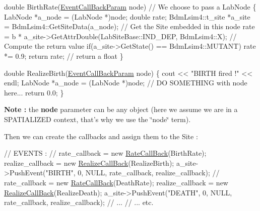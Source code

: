 \begin{DoxyCode}
\textcolor{keywordtype}{double} BirthRate(\hyperlink{namespaceelps_a1bd4230d698fa66dd38f0fc1cc5c2c55}{EventCallBackParam} node)                                   \textcolor{comment}{// We choose
       to pass a LabNode}
\{
        LabNode *a\_node = (LabNode *)node;
        \textcolor{keywordtype}{double} rate;
        BdmLsim4::t\_site *a\_site = BdmLsim4::GetSiteData(a\_node);               \textcolor{comment}{// Get the Site embedded in
       this node}
        rate = b * a\_site->GetAttrDouble(LabSiteBase::IND\_DEP, BdmLsim4::X);    \textcolor{comment}{// Compute the return value}
        \textcolor{keywordflow}{if}(a\_site->GetState() == BdmLsim4::MUTANT)
                rate *= 0.9;
        \textcolor{keywordflow}{return} rate;                                                            \textcolor{comment}{// return a float}
\}

\textcolor{keywordtype}{double} RealizeBirth(\hyperlink{namespaceelps_a1bd4230d698fa66dd38f0fc1cc5c2c55}{EventCallBackParam} node)
\{
        cout << \textcolor{stringliteral}{"BIRTH fired !"} << endl;
        LabNode *a\_node = (LabNode *)node;
        \textcolor{comment}{// DO SOMETHING with node here...}
        \textcolor{keywordflow}{return} 0.0;
\}
\end{DoxyCode}


{\bfseries Note \+:} the {\bfseries node} parameter can be any object (here we assume we are in a S\+P\+A\+T\+I\+A\+L\+I\+Z\+E\+D context, that's why we use the \char`\"{}node\char`\"{} term).

Then we can create the callbacks and assign them to the Site \+:


\begin{DoxyCode}
\textcolor{comment}{// EVENTS :}
\textcolor{comment}{//}
rate\_callback = \textcolor{keyword}{new} \hyperlink{namespaceelps_a121bfb217e5fbb734b95d3f7b6653fb2}{RateCallBack}(BirthRate);
realize\_callback = \textcolor{keyword}{new} \hyperlink{namespaceelps_adb49d5dbf827d9b190d0b1fd15e0193c}{RealizeCallBack}(RealizeBirth);
a\_site->PushEvent(\textcolor{stringliteral}{"BIRTH"}, 0, NULL, rate\_callback, realize\_callback);
\textcolor{comment}{//}
rate\_callback = \textcolor{keyword}{new} \hyperlink{namespaceelps_a121bfb217e5fbb734b95d3f7b6653fb2}{RateCallBack}(DeathRate);
realize\_callback = \textcolor{keyword}{new} \hyperlink{namespaceelps_adb49d5dbf827d9b190d0b1fd15e0193c}{RealizeCallBack}(RealizeDeath);
a\_site->PushEvent(\textcolor{stringliteral}{"DEATH"}, 0, NULL, rate\_callback, realize\_callback);
\textcolor{comment}{// ...}
\textcolor{comment}{// ... etc.}
\end{DoxyCode}


